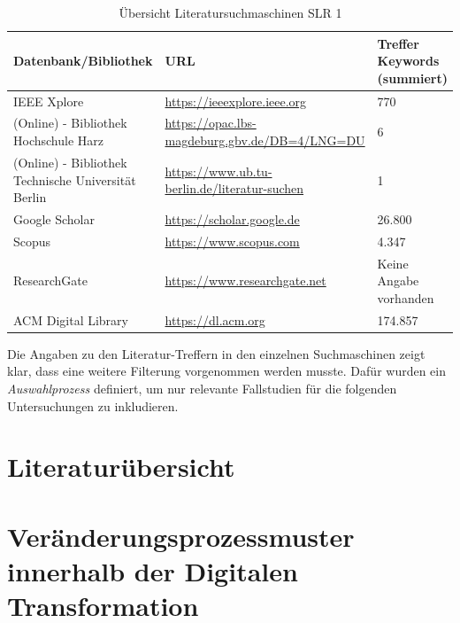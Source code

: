 \begin{table}[ht]
	\centering
	\caption{Übersicht Literatursuchmaschinen SLR 1}
	\begin{tabular}{|p{5cm}|p{7cm}||p{3cm}|}
		\hline
		\textbf{Datenbank/Bibliothek}& \textbf{URL} &  \textbf{Treffer Keywords  (summiert)} \\
		\hline
		IEEE Xplore & \url{https://ieeexplore.ieee.org} & 770 \\
		(Online) - Bibliothek Hochschule Harz & \url{https://opac.lbs-magdeburg.gbv.de/DB=4/LNG=DU} & 6 \\
		(Online) - Bibliothek Technische Universität Berlin  & \url{https://www.ub.tu-berlin.de/literatur-suchen}& 1 \\
		Google Scholar &  \url{https://scholar.google.de}  & 26.800 \\
		Scopus & \url{https://www.scopus.com} & 4.347 \\
		ResearchGate & \url{https://www.researchgate.net} &Keine Angabe vorhanden \footnotemark \\ 
		ACM Digital Library & \url{https://dl.acm.org} & 174.857 \\
		\hline
	\end{tabular}
	\label{tab:suchmaschinenslr1}
\end{table}


Die Angaben zu den Literatur-Treffern in den einzelnen Suchmaschinen zeigt klar, dass eine weitere Filterung vorgenommen werden musste. Dafür wurden ein \textit{Auswahlprozess} definiert, um nur relevante Fallstudien für die folgenden Untersuchungen zu inkludieren.

\todots

\section{Literaturübersicht}



\todots

\section{Veränderungsprozessmuster innerhalb der Digitalen Transformation}
\label{problemfields:changepatterns}

